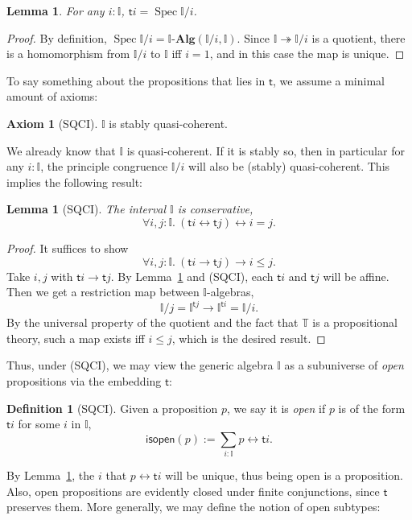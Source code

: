 \documentclass[12pt]{amsart}
\newtheorem{lemma}[theorem]{Lemma}
\theoremstyle{definition}
\newtheorem{definition}[theorem]{Definition}
\newtheorem{axiom}{Axiom}
\newcommand{\mb}[1]{\mathbf{#1}}
\newcommand{\mbb}[1]{\mathbb{#1}}
\newcommand{\T}{\mbb T}
\newcommand{\I}{\mbb I}
\newcommand{\ms}[1]{\mathsf{#1}}
\newcommand{\alg}{\text{-}\mb{Alg}}
\newcommand{\surj}{\twoheadrightarrow}
\newcommand{\fa}[2]{\forall #1\!\colon\!\!#2.\ }
\newcommand{\eq}{\leftrightarrow}
\newcommand{\spec}{\operatorname{Spec}}
\begin{document}
\begin{lemma}\label{lem:openpropaffine}
  For any $i : \I$, $\ms ti = \spec \I/i$.
\end{lemma}
\begin{proof}
  By definition, $\spec \I/i = \I\alg(\I/i,\I)$. Since $\I \surj \I/i$ is a quotient, there is a homomorphism from $\I/i$ to $\I$ iff $i = 1$, and in this case the map is unique.
\end{proof}

To say something about the propositions that lies in $\ms t$, we assume a minimal amount of axioms:

\begin{axiom}[SQCI]
  $\I$ is stably quasi-coherent.
\end{axiom}

We already know that $\I$ is quasi-coherent. If it is stably so, then in particular for any $i : \I$, the principle congruence $\I/i$ will also be (stably) quasi-coherent. This implies the following result:

\begin{lemma}[SQCI]\label{lem:intconserve}
  The interval $\I$ is conservative,
  \[ \fa{i,j}{\I} (\ms ti \eq \ms tj) \eq i = j. \]
\end{lemma}
\begin{proof}
  It suffices to show
  \[ \fa{i,j}{\I}(\ms ti \to \ms tj) \to i \le j. \]
  Take $i,j$ with $\ms ti \to \ms tj$. By Lemma~\ref{lem:openpropaffine} and (SQCI), each $\ms ti$ and $\ms tj$ will be affine. Then we get a restriction map between $\I$-algebras,
  \[ \I/j = \I^{\ms tj} \to \I^{\ms ti} = \I/i. \]
  By the universal property of the quotient and the fact that $\T$ is a propositional theory, such a map exists iff $i \le j$, which is the desired result.
\end{proof}

Thus, under (SQCI), we may view the generic algebra $\I$ as a subuniverse of \emph{open} propositions via the embedding $\ms t$:

\begin{definition}[SQCI]
  Given a proposition $p$, we say it is \emph{open} if $p$ is of the form $\ms ti$ for some $i$ in $\I$,
  \[ \ms{isopen}(p) := \sum_{i:\I}p \eq \ms ti. \]
\end{definition}

By Lemma~\ref{lem:intconserve}, the $i$ that $p \eq \ms ti$ will be unique, thus being open is a proposition. Also, open propositions are evidently closed under finite conjunctions, since $\ms t$ preserves them. More generally, we may define the notion of open subtypes:
\end{document}
